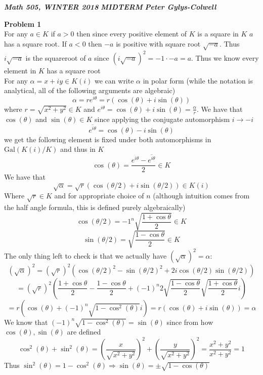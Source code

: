 \documentclass[12pt]{article}
\newenvironment{ques}[1]{\textbf{Problem #1}\vspace{1 mm}\\ }{\bigskip}
\theoremstyle{definition}
\renewcommand{\l}{\left }
\renewcommand{\r}{\right }
\newcommand{\s}{\sin}
\renewcommand{\c}{\cos}
\renewcommand{\t}{\theta}
\renewcommand{\a}{\alpha}
\newcommand{\Gal}{\text{Gal}}
\begin{document}
\noindent \textit{\textbf{Math 505, WINTER 2018}} \hspace{1.3cm}
\textit{\textbf{MIDTERM}} \hspace{1.3cm} \textit{\textbf{Peter
Gylys-Colwell}} 

\vspace{1cm}

\begin{ques}{1}
	For any $a \in K$ if $a > 0$ then since every positive element of $K$ is a
	square in $K$ $a$ has a square root. If $a < 0$ then $-a$ is positive with
	square root $\sqrt{-a}$. Thus $i\sqrt{-a}$ is the squareroot of $a$ since
	$(i\sqrt{-a})^2 = -1 \cdot -a = a$. Thus we know every element in $K$ has a
	square root\\
	For any $\a = x + iy \in K(i)$ we can write $\a$ in polar form (while the
	notation is analytical, all of the following arguments are algebraic)
	$$\a = re^{i\t} = r(\cos(\t) + i \sin(\theta))$$
	where $r = \sqrt{x^2 + y^2} \in K$ and $e^{i\t} = \cos(\t) + i \sin(\theta) =
	\frac{\a}{r}$.  We have that $\c(\t)$ and $\s(\t) \in K$ since applying the
	conjugate automorphism $i \to -i$
	$$\overline{e^{i\t}} = \cos(\t) - i\sin(\t)$$
	we get the following element is fixed under both automorphisms in
	$\Gal(K(i)/K)$ and thus in $K$
	$$\cos(\t) = \frac{e^{i\t} - \overline{e^{i\t}}}{2} \in K$$
	We have that
	$$\sqrt \a = \sqrt{r}(\cos(\t/2) + i\sin (\t/2)) \in K(i)$$
	Where $\sqrt r \in K$ and for appropriate choice of $n$ (although intuition
	comes from the half angle formula, this is defined purely algebraically)
	$$\cos(\t/2) =-1^n\sqrt{\frac{1 + \cos \t}{2}} \in K$$
	$$\sin (\t/2) = \sqrt{\frac{1 - \cos \t}{2}} \in K$$
	The only thing left to check is that we actually have $\l(\sqrt \a \r)^2 =
	\a$:
	$$\l(\sqrt \a \r)^2 = (\sqrt{r})^2(\cos(\t/2)^2 - \sin(\t/2)^2 +
	2i\cos(\t/2)\sin(\t/2))$$
	$$= (\sqrt{r})^2\l( \frac{1 + \cos \t}{2}- \frac{1 - \cos \t}{2}
	+(-1)^{n}2\sqrt{\frac{1 - \cos \t}{2}} \sqrt{\frac{1 + \cos \t}{2}}i \r)$$
	$$= r(\cos(\t) + (-1)^n\sqrt{1 - \cos^2(\t)}i) = r(\cos(\theta) + i\sin(\t)) = \a$$
	We know that $(-1)^n\sqrt{1 - \cos^2(\t)} = \sin(\t)$ since from how
	$\cos(\theta), \sin(\t)$ are defined
	$$\cos^2(\t) + \sin^2(\t) = \l(\frac{x}{\sqrt{x^2 + y^2}}\r)^2
	+ \l(\frac{y}{\sqrt{x^2 + y^2}}\r)^2 = \frac{x^2 + y^2}{x^2 + y^2} = 1$$
	Thus $\sin^2(\t) = 1 - \cos^{2}(\t) \Rightarrow \sin(\t) = \pm \sqrt{1 -
	\cos(\t)}$
\end{ques}
\end{document}

